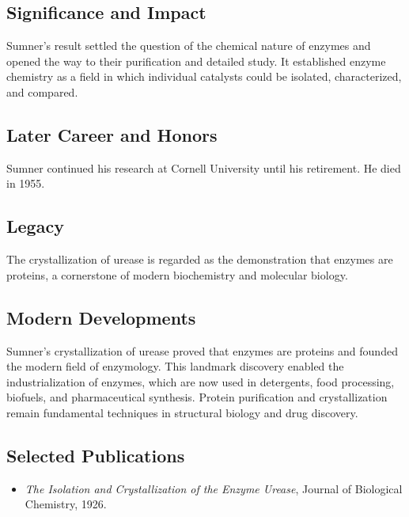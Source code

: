 \subsection*{Significance and Impact}

Sumner's result settled the question of the chemical nature of enzymes and opened the way to their purification and detailed study. It established enzyme chemistry as a field in which individual catalysts could be isolated, characterized, and compared.

\subsection*{Later Career and Honors}

Sumner continued his research at Cornell University until his retirement. He died in 1955.

\subsection*{Legacy}

The crystallization of urease is regarded as the demonstration that enzymes are proteins, a cornerstone of modern biochemistry and molecular biology.

\subsection*{Modern Developments}

Sumner's crystallization of urease proved that enzymes are proteins and founded the modern field of enzymology. This landmark discovery enabled the industrialization of enzymes, which are now used in detergents, food processing, biofuels, and pharmaceutical synthesis. Protein purification and crystallization remain fundamental techniques in structural biology and drug discovery.

\subsection*{Selected Publications}

\begin{itemize}

\item \emph{The Isolation and Crystallization of the Enzyme Urease}, Journal of Biological Chemistry, 1926.

\end{itemize}

\clearpage

